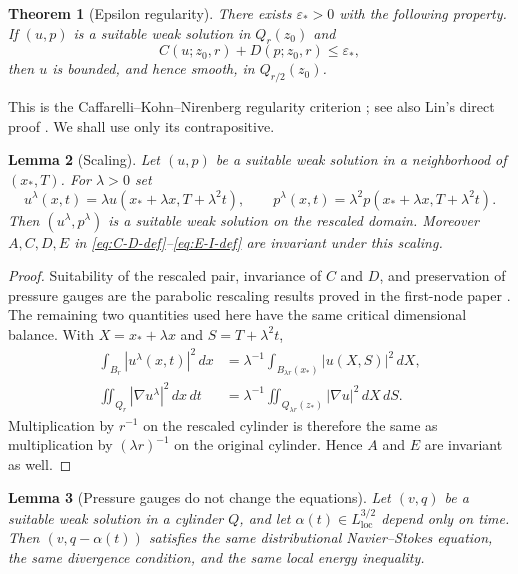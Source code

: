 \documentclass[11pt]{amsart}
\theoremstyle{plain}
\newtheorem{theorem}{Theorem}[section]
\newtheorem{lemma}[theorem]{Lemma}
\theoremstyle{definition}
\theoremstyle{remark}
\numberwithin{equation}{section}
\newcommand{\eps}{\varepsilon}
\begin{document}
\begin{theorem}[Epsilon regularity]\label{thm:eps-reg}
There exists \(\eps_*>0\) with the following property.  If \((u,p)\) is a
suitable weak solution in \(Q_r(z_0)\) and
\[
   C(u;z_0,r)+D(p;z_0,r)\le \eps_*,
\]
then \(u\) is bounded, and hence smooth, in \(Q_{r/2}(z_0)\).
\end{theorem}

This is the Caffarelli--Kohn--Nirenberg regularity criterion
\cite{CKN1982}; see also Lin's direct proof \cite{Lin1998}.  We shall use only
its contrapositive.

\begin{lemma}[Scaling]\label{lem:scaling}
Let \((u,p)\) be a suitable weak solution in a neighborhood of
\((x_*,T)\).  For \(\lambda>0\) set
\[
   u^\lambda(x,t)=\lambda u(x_*+\lambda x,T+\lambda^2t),
   \qquad
   p^\lambda(x,t)=\lambda^2 p(x_*+\lambda x,T+\lambda^2t).
\]
Then \((u^\lambda,p^\lambda)\) is a suitable weak solution on the rescaled
domain.  Moreover \(A,C,D,E\) in
\eqref{eq:C-D-def}--\eqref{eq:E-I-def} are invariant under
this scaling.
\end{lemma}

\begin{proof}
Suitability of the rescaled pair, invariance of \(C\) and \(D\), and
preservation of pressure gauges are the parabolic rescaling results
proved in the first-node paper
\cite[Section 2 and Proposition \texttt{prop:critical-scaling}]
{Paper0LocalConcentration}.  The remaining two quantities used here have the
same critical dimensional balance.  With \(X=x_*+\lambda x\) and
\(S=T+\lambda^2t\),
\begin{align*}
   \int_{B_r}|u^\lambda(x,t)|^2\,dx
   &=
   \lambda^{-1}\int_{B_{\lambda r}(x_*)}|u(X,S)|^2\,dX,\\
   \iint_{Q_r}|\nabla u^\lambda|^2\,dx\,dt
   &=
   \lambda^{-1}\iint_{Q_{\lambda r}(z_*)}|\nabla u|^2\,dX\,dS .
\end{align*}
Multiplication by \(r^{-1}\) on the rescaled cylinder is therefore the same as
multiplication by \((\lambda r)^{-1}\) on the original cylinder.  Hence
\(A\) and \(E\) are invariant as well.
\end{proof}

\begin{lemma}[Pressure gauges do not change the equations]\label{lem:gauges-harmless}
Let \((v,q)\) be a suitable weak solution in a cylinder \(Q\), and let
\(\alpha(t)\in L^{3/2}_{\mathrm{loc}}\) depend only on time.  Then
\((v,q-\alpha(t))\) satisfies the same distributional Navier--Stokes equation,
the same divergence condition, and the same local energy inequality.
\end{lemma}
\end{document}
